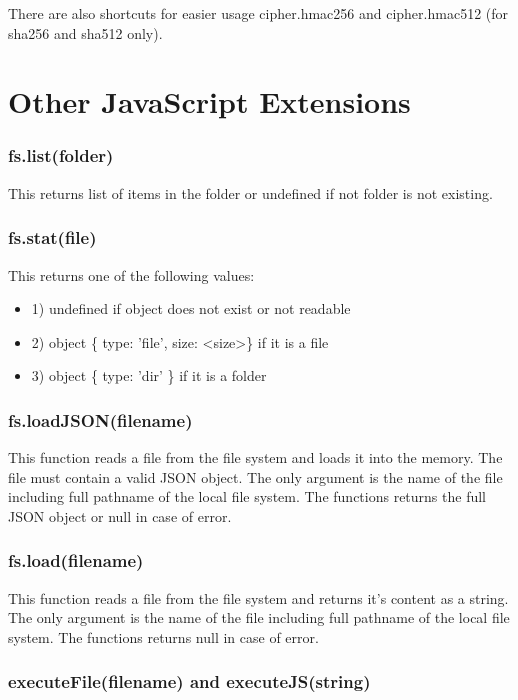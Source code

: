 There are also shortcuts for easier usage cipher.hmac256 and cipher.hmac512 (for sha256 and sha512 only).

\section{Other JavaScript Extensions}

\subsubsection{fs.list(folder)}

This returns list of items in the folder or undefined if not folder is not existing.


\subsubsection{fs.stat(file)}

This returns one of the following values:

\begin{itemize}
\item 1) undefined if object does not exist or not readable
\item 2) object \{ type: 'file', size: \textless{}size\textgreater{}\} if it is a file
\item 3) object \{ type: 'dir' \} if it is a folder
\end{itemize} 


\subsubsection{fs.loadJSON(filename)}

This function reads a file from the file system and loads it into the memory. The file must contain a valid JSON object. The only argument is the name of the file including full pathname of the local file system. The functions returns the full JSON object or null in case of error.

\subsubsection{fs.load(filename)}

This function reads a file from the file system and returns it's content as a string. The only argument is the name of the file including full pathname of the local file system. The functions returns null in case of error.

\subsubsection{executeFile(filename) and executeJS(string)}

